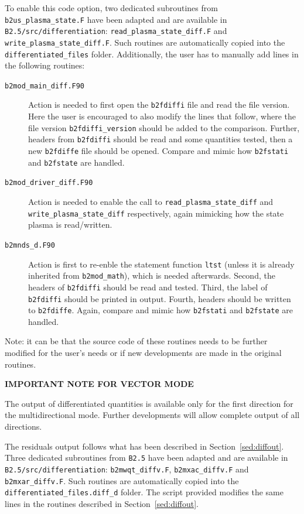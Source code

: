 \begin{sloppypar}
To enable this code option, two dedicated subroutines from {\tt b2us\_plasma\_state.F} have been adapted and are available in {\tt B2.5/src/differentiation}: {\tt read\_plasma\_state\_diff.F} and {\tt write\_plasma\_state\_diff.F}. Such routines are automatically copied into the {\tt differentiated\_files} folder. Additionally, the user has to manually add lines in the following routines:
\begin{description}
  \item[\tt b2mod\_main\_diff.F90] Action is needed to first open the {\tt b2fdiffi} file and read the file version. Here the user is encouraged to also modify the lines that follow, where the file version {\tt b2fdiffi\_version} should be added to the comparison. Further, headers from {\tt b2fdiffi} should be read and some quantities tested, then a new {\tt b2fdiffe} file should be opened. Compare and mimic how {\tt b2fstati} and {\tt b2fstate} are handled.

  \item[\tt b2mod\_driver\_diff.F90] Action is needed to enable the call to {\tt read\_plasma\_state\_diff} and {\tt write\_plasma\_state\_diff} respectively, again mimicking how the state plasma is read/written.

  \item[\tt b2mnds\_d.F90] Action is first to re-enble the statement function {\tt ltst} (unless it is already inherited from {\tt b2mod\_math}), which is needed afterwards. Second, the headers of {\tt b2fdiffi} should be read and tested. Third, the label of {\tt b2fdiffi} should be printed in output. Fourth, headers should be written to {\tt b2fdiffe}. Again, compare and mimic how {\tt b2fstati} and {\tt b2fstate} are handled.
\end{description}
\end{sloppypar}

Note: it can be that the source code of these routines needs to be further modified for the user's needs or if new developments are made in the original routines.

\textbf{IMPORTANT NOTE FOR VECTOR MODE}

The output of differentiated quantities is available only for the first direction for the multidirectional mode. Further developments will allow complete output of all directions.

The residuals output follows what has been described in Section~\ref{sed:diffout}. Three dedicated subroutines from {\tt B2.5} have been adapted and are available in {\tt B2.5/src/differentiation}: {\tt b2mwqt\_diffv.F}, {\tt b2mxac\_diffv.F} and {\tt b2mxar\_diffv.F}. Such routines are automatically copied into the {\tt differentiated\_files.diff\_d} folder. The script provided modifies the same lines in the routines described in Section~\ref{sed:diffout}.

